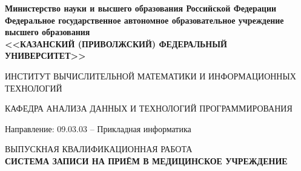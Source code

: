 \documentclass[a4paper,article]{article}
\begin{document}
    \begin{titlepage}
        \begin{center}
            {\bfseries Министерство науки и высшего образования Российской Федерации \\
            Федеральное государственное автономное образовательное учреждение \\
            высшего образования \\
            <<КАЗАНСКИЙ (ПРИВОЛЖСКИЙ) ФЕДЕРАЛЬНЫЙ УНИВЕРСИТЕТ>>}
        \end{center}

        \begin{center}
            ИНСТИТУТ ВЫЧИСЛИТЕЛЬНОЙ МАТЕМАТИКИ И ИНФОРМАЦИОННЫХ ТЕХНОЛОГИЙ
        \end{center}

        \begin{center}
            КАФЕДРА АНАЛИЗА ДАННЫХ И ТЕХНОЛОГИЙ ПРОГРАММИРОВАНИЯ
        \end{center}

        \begin{center}
            Направление: 09.03.03 – Прикладная информатика
        \end{center}

        \vspace{0mm}

        \begin{center}
            ВЫПУСКНАЯ КВАЛИФИКАЦИОННАЯ РАБОТА \\
            {\bfseries СИСТЕМА ЗАПИСИ НА ПРИЁМ В МЕДИЦИНСКОЕ УЧРЕЖДЕНИЕ}
        \end{center}

        \vfill


\end{titlepage}
\end{document}
